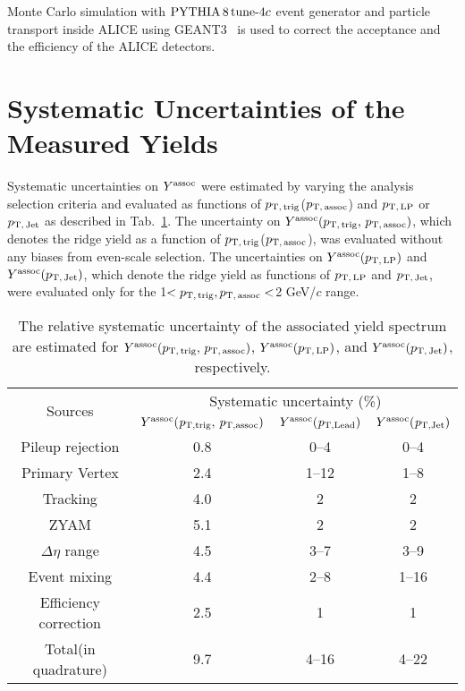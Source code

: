 Monte Carlo simulation with $\mathrm{PYTHIA}\,8\,\mathrm{tune}{\text -}4c$ event generator and particle transport inside ALICE using GEANT3~\cite{Brun:1994aa} is used to correct the acceptance and the efficiency of the ALICE detectors. 


\section{Systematic Uncertainties of the Measured Yields}
\label{sec:uncertainties}

Systematic uncertainties on $Y^{\rm{assoc}}$ were estimated by varying the analysis selection criteria and evaluated as functions of $p_\mathrm{T,\,trig}$($p_\mathrm{T,\,assoc}$) and $p_\mathrm{T,\,LP}$ or $p_\mathrm{T,\,Jet}$ as described in Tab.~\ref{tab:syst}. The uncertainty on $Y^{\rm{assoc}}(p_\mathrm{T,\,trig},\,p_\mathrm{T,\,assoc})$, which denotes the ridge yield as a function of $p_\mathrm{T,\,trig}$($p_\mathrm{T,\,assoc}$), was evaluated without any biases from even-scale selection. The uncertainties on $Y^{\rm{assoc}}(p_\mathrm{T,\,LP})$ and $Y^{\rm{assoc}}(p_\mathrm{T,\,Jet})$, which denote the ridge yield as functions of $p_\mathrm{T,\,LP}$ and $p_\mathrm{T,\,Jet}$, were evaluated only for the 1$<p_\mathrm{T,\,trig}, p_\mathrm{T,\,assoc}<$2 GeV/$c$ range.

\begin{table}[h!]
\caption{The relative systematic uncertainty of the associated yield spectrum are estimated for $Y^{\rm{assoc}}(p_\mathrm{T,\,trig},\,p_\mathrm{T,\,assoc})$, $Y^{\rm{assoc}}(p_\mathrm{T,\,LP})$, and $Y^{\rm{assoc}}(p_\mathrm{T,\,Jet})$, respectively.}
\centering
\begin{tabular}{|c|c|c|c|}
\hline 
\multirow{2}{*}{Sources}  & \multicolumn{3}{c|}{Systematic uncertainty (\%)} \\\cline{2-4}
         & $Y^{\rm{assoc}}(\it{p}_{\rm{T, trig}},\,\it{p}_{\rm{T, assoc}})$ & $Y^{\rm{assoc}}(\it{p}_{\rm{T, Lead}})$ & $Y^{\rm{assoc}}(\it{p}_{\rm{T, Jet}})$ \\ \hline \hline
Pileup rejection		& 0.8	&0--4		&0--4		\\ \hline
Primary Vertex		& 2.4	&1--12	&1--8		\\ \hline

Tracking			& 4.0 	&2		&2		\\ \hline

ZYAM			& 5.1	&2		&2		\\ \hline
$\Delta\eta$ range	& 4.5	&3--7		&3--9		\\ \hline

Event mixing			& 4.4	&2--8		&1--16	\\ \hline

Efficiency correction	& 2.5 	&1		&1		\\ \hline \hline
Total(in quadrature)			& 9.7	&4--16	&4--22	\\ 
\hline 
\end{tabular}
\label{tab:syst}
\end{table}

